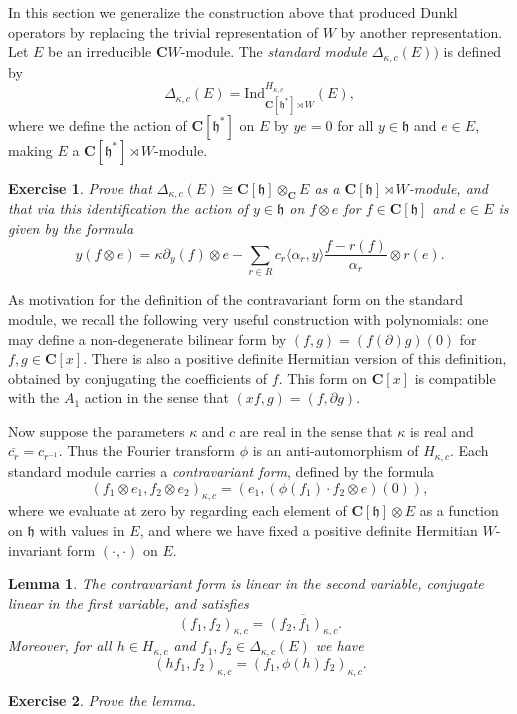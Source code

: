\documentclass[12pt, reqno]{amsart}
\numberwithin{equation}{section}
\theoremstyle{definition}
\theoremstyle{plain}
\newtheorem{lemma}[theorem]{Lemma}
\newtheorem{exercise}{Exercise}
\newcommand{\CC}{\mathbf{C}}
\newcommand{\hh}{\mathfrak{h}}
\newcommand{\la}{\langle}
\newcommand{\ra}{\rangle}
\begin{document}
In this section we generalize the construction above that produced Dunkl operators by replacing the trivial representation of $W$ by another representation. Let $E$ be an irreducible $\CC W$-module. The \emph{standard module} $\Delta_{\kappa,c}(E))$ is defined by
$$\Delta_{\kappa,c}(E)=\mathrm{Ind}_{\CC[\hh^*] \rtimes W}^{H_{\kappa,c}} (E),$$ where we define the action of $\CC[\hh^*]$ on $E$ by $ye=0$ for all $y \in \hh$ and $e \in E$, making $E$ a $\CC[\hh^*] \rtimes W$-module.
\begin{exercise}
Prove that $\Delta_{\kappa,c}(E) \cong \CC[\hh] \otimes_\CC E$ as a $\CC[\hh] \rtimes W$-module, and that via this identification the action of $y \in \hh$ on $f \otimes e$ for $f \in \CC[\hh]$ and $e \in E$ is given by the formula
$$y(f \otimes e)=\kappa \partial_y(f) \otimes e-\sum_{r \in R} c_r \la \alpha_r,y \ra \frac{f-r(f)}{\alpha_r} \otimes r(e).$$ 	
\end{exercise}

As motivation for the definition of the contravariant form on the standard module, we recall the following very useful construction with polynomials: one may define a non-degenerate bilinear form by $(f,g)=(f(\partial)g)(0)$ for $f,g \in \CC[x]$. There is also a positive definite Hermitian version of this definition, obtained by conjugating the coefficients of $f$. This form on $\CC[x]$ is compatible with the $A_1$ action in the sense that $(x f,g)=(f,\partial g)$.

Now suppose the parameters $\kappa$ and $c$ are real in the sense that $\kappa$ is real and $\overline{c_r}=c_{r^{-1}}$. Thus the Fourier transform $\phi$ is an anti-automorphism of $H_{\kappa,c}$. Each standard module carries a \emph{contravariant form}, defined by the formula
$$(f_1 \otimes e_1,f_2 \otimes e_2 )_{\kappa,c}=(e_1,(\phi(f_1) \cdot f_2 \otimes e)(0)),$$ where we evaluate at zero by regarding each element of $\CC[\hh] \otimes E$ as a function on $\hh$ with values in $E$, and where we have fixed a positive definite Hermitian $W$-invariant form $(\cdot,\cdot)$ on $E$.

\begin{lemma}
The contravariant form is linear in the second variable, conjugate linear in the first variable, and satisfies
$$(f_1,f_2)_{\kappa,c}=\overline{(f_2,f_1)_{\kappa,c}}.$$ Moreover, for all $h \in H_{\kappa,c}$ and $f_1,f_2 \in \Delta_{\kappa,c}(E)$ we have
$$(h f_1,f_2)_{\kappa,c}=(f_1,\phi(h) f_2)_{\kappa,c}.$$
\end{lemma}
\begin{exercise}
Prove the lemma.	
\end{exercise}
\end{document}
